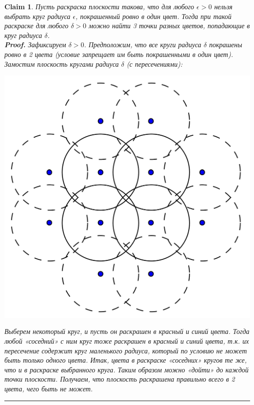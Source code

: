 \documentclass{report}%
\newtheorem{claim}[theorem]{Claim}
\newenvironment{proof}[1][Proof]{\textbf{#1.} }{\ \rule{0.5em}{0.5em}}
\begin{document}
\begin{claim}
		Пусть раскраска плоскости такова, что для любого $\epsilon > 0$ нельзя выбрать круг радиуса $\epsilon$,
		покрашенный ровно в один цвет. Тогда при такой раскраске для любого $\delta > 0$
		можно найти 3 точки разных цветов, попадающие в круг радиуса $\delta$. \\
		\begin{proof}
				Зафиксируем $\delta > 0$. Предположим, что все круги радиуса $\delta$ покрашены ровно в 2 цвета
				(условие запрещает им быть покрашенными в один цвет).
				Замостим плоскость кругами радиуса $\delta$ (с пересечениями): \\
				\begin{center}
						\includegraphics[scale = 0.5]{my_claim2}
				\end{center}
				
				Выберем некоторый круг, и пусть он раскрашен в красный и синий цвета.
				Тогда любой «соседний» с ним круг тоже раскрашен в красный и синий цвета,
				т.к. их пересечение содержит круг маленького радиуса, который по условию не может быть только одного цвета.
				Итак, цвета в раскраске «соседних» кругов те же, что и в раскраске выбранного круга.
				Таким образом можно «дойти» до каждой точки плоскости.
				Получаем, что плоскость раскрашена правильно всего в 2 цвета, чего быть не может.
		\end{proof}
\end{claim}
\end{document}
